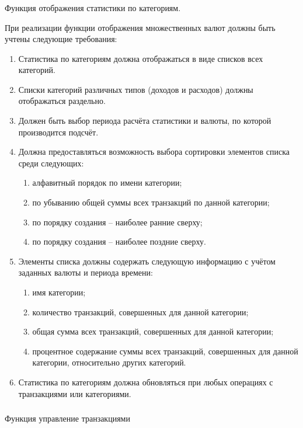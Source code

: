 \subsubsection{} Функция отображения статистики по категориям.
\label{sec:domain:specification:categories_stats}

При реализации функции отображения множественных валют должны быть учтены следующие требования:

\begin{enumerate}
    \item Статистика по категориям должна отображаться в виде списков всех категорий.
    \item Списки категорий различных типов (доходов и расходов) должны отображаться раздельно.
    \item Должен быть выбор периода расчёта статистики и валюты, по которой производится подсчёт.
    \item Должна предоставляться возможность выбора сортировки элементов списка среди следующих:
    \begin{enumerate}
        \item алфавитный порядок по имени категории;
        \item по убыванию общей суммы всех транзакций по данной категории;
        \item по порядку создания -- наиболее ранние сверху;
        \item по порядку создания -- наиболее поздние сверху.
    \end{enumerate}
    \item Элементы списка должны содержать следующую информацию с учётом заданных валюты и периода времени:
    \begin{enumerate}
        \item имя категории;
        \item количество транзакций, совершенных для данной категории;
        \item общая сумма всех транзакций, совершенных для данной категории;
        \item процентное содержание суммы всех транзакций, совершенных для данной категории, относительно других категорий.
    \end{enumerate}
    \item Статистика по категориям должна обновляться при любых операциях с транзакциями или категориями.
\end{enumerate}

\subsubsection{} Функция управление транзакциями
\label{sec:domain:specification:transactions}

